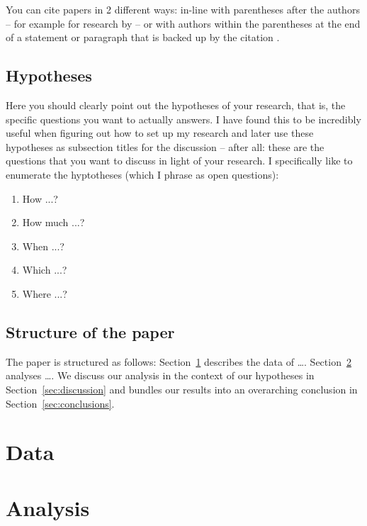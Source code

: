 \documentclass[twocolumn,apj,numberedappendix,appendixfloats]{openjournal}
\begin{document}
You can cite papers in 2 different ways: in-line with parentheses after the authors -- for example for research by \citet{Buder2024} -- or with authors within the parentheses at the end of a statement or paragraph that is backed up by the citation \citep{Buder2024}.

\subsection{Hypotheses}

Here you should clearly point out the hypotheses of your research, that is, the specific questions you want to actually answers. I have found this to be incredibly useful when figuring out how to set up my research and later use these hypotheses as subsection titles for the discussion -- after all: these are the questions that you want to discuss in light of your research. I specifically like to enumerate the hyptotheses (which I phrase as open questions):

\begin{enumerate}
    \item How ...?
    \item How much ...?
    \item When ...?
    \item Which ...?
    \item Where ...?
\end{enumerate}

\subsection{Structure of the paper}

The paper is structured as follows: Section~\ref{sec:data} describes the data of \dots. Section~\ref{sec:analysis} analyses \dots. We discuss our analysis in the context of our hypotheses in Section~\ref{sec:discussion} and bundles our results into an overarching conclusion in Section~\ref{sec:conclusions}.

\clearpage
\section{Data} \label{sec:data}



\clearpage
\section{Analysis} \label{sec:analysis}
\end{document}
